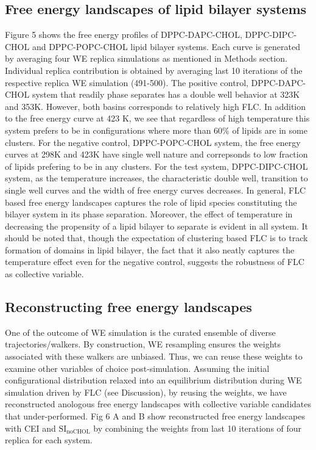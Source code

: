 \documentclass{biophys-new}
\begin{document}
\subsection*{Free energy landscapes of lipid bilayer systems}

Figure 5 shows the free energy profiles of DPPC-DAPC-CHOL, DPPC-DIPC-CHOL and DPPC-POPC-CHOL lipid bilayer systems.
Each curve is generated by averaging four WE replica simulations as mentioned in Methods section.
Individual replica contribution is obtained by averaging last 10 iterations of the respective replica WE simulation (491-500). 
The positive control, DPPC-DAPC-CHOL system that readily phase separates has a double well behavior at 323K and 353K.
However, both basins corresponds to relatively high FLC.
In addition to the free energy curve at 423 K, we see that regardless of high temperature this system prefers to be in configurations where more than 60\% of lipids are in some clusters.
For the negative control, DPPC-POPC-CHOL system, the free energy curves at 298K and 423K have single well nature and correpsonds to low fraction of lipids prefering to be in any clusters.
For the test system, DPPC-DIPC-CHOL system, as the temperature increases, the characteristic double well, transition to single well curves and the width of free energy curves decreases.
In general, FLC based free energy landscapes captures the role of lipid species constituting the bilayer system in its phase separation.
Moreover, the effect of temperature in decreasing the propensity of a lipid bilayer to separate is evident in all system.
It should be noted that, though the expectation of clustering based FLC is to track formation of domains in lipid bilayer, the fact that it also neatly captures the temperature effect even for the negative control, suggests the robustness of FLC as collective variable.


\subsection*{Reconstructing free energy landscapes}
One of the outcome of WE simulation is the curated ensemble of diverse trajectories/walkers.
By construction, WE resampling ensures the weights associated with these walkers are unbiased.
Thus, we can reuse these weights to examine other variables of choice post-simulation.
Assuming the initial configurational distribution relaxed into an equilibrium distribution during WE simulation driven by FLC (see Discussion), 
by reusing the weights, we have reconstructed anologous free energy landscapes with collective variable candidates that under-performed.
Fig 6 A and B show reconstructed free energy landscapes with CEI and $\text{SI}_{\text{noCHOL}}$ by combining the weights from last 10 iterations of four replica for each system.
\end{document}
